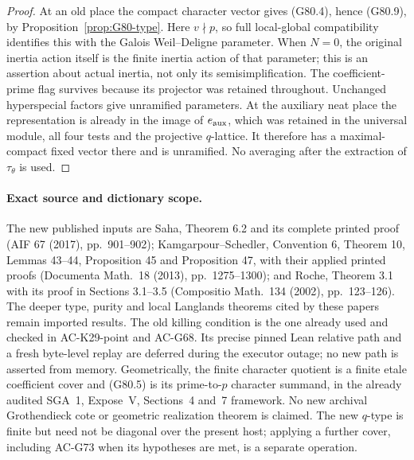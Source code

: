 \begin{proof}
At an old place the compact character vector gives (G80.4), hence
(G80.9), by Proposition~\ref{prop:G80-type}.
Here \(v\nmid p\), so full local-global compatibility identifies this
with the Galois Weil--Deligne parameter.  When \(N=0\), the original
inertia action itself is the finite inertia action of that parameter;
this is an assertion about actual inertia, not only its
semisimplification.  The coefficient-prime flag survives because its
projector was retained throughout.  Unchanged hyperspecial factors
give unramified parameters.  At the auxiliary neat place the representation is already in the
image of \(e_{\rm aux}\), which was retained in the universal module,
all four tests and the projective \(q\)-lattice.  It therefore has a
maximal-compact fixed vector there and is unramified.  No averaging
after the extraction of \(\tau_\theta\) is used.
\end{proof}

\paragraph{Exact source and dictionary scope.}
The new published inputs are Saha, Theorem 6.2 and its complete printed
proof (AIF 67 (2017), pp.~901--902); Kamgarpour--Schedler,
Convention 6, Theorem 10, Lemmas 43--44, Proposition 45 and
Proposition 47, with their applied printed proofs (Documenta Math.~18
(2013), pp.~1275--1300); and Roche, Theorem 3.1 with its proof in
Sections 3.1--3.5 (Compositio Math.~134 (2002), pp.~123--126).
The deeper type, purity and local Langlands theorems cited by these
papers remain imported results.
The old killing condition is the one already used and checked in
AC-K29-point and AC-G68.  Its precise pinned Lean relative path and a
fresh byte-level replay are deferred during the executor outage;
no new path is asserted from memory.
Geometrically, the finite character quotient is a finite etale
coefficient cover and (G80.5) is its prime-to-\(p\) character summand,
in the already audited SGA~1, Expose~V, Sections~4 and~7 framework.
No new archival Grothendieck cote or geometric realization theorem is
claimed.  The new \(q\)-type is finite but need not be diagonal over the
present host; applying a further cover, including AC-G73 when its
hypotheses are met, is a separate operation.
